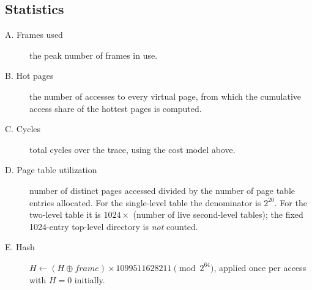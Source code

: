 \documentclass[11pt,a4paper]{article}
\begin{document}
\subsection{Statistics}
\begin{description}
\item[A. Frames used] the peak number of frames in use.
\item[B. Hot pages] the number of accesses to every virtual page, from which the cumulative access share of the hottest pages is computed.
\item[C. Cycles] total cycles over the trace, using the cost model above.
\item[D. Page table utilization] number of distinct pages accessed divided by the number of page table entries allocated. For the single-level table the denominator is $2^{20}$. For the two-level table it is $1024 \times$ (number of live second-level tables); the fixed 1024-entry top-level directory is \emph{not} counted.
\item[E. Hash] $H \leftarrow (H \oplus \mathit{frame}) \times 1099511628211 \pmod{2^{64}}$, applied once per access with $H=0$ initially.
\end{description}
\end{document}
